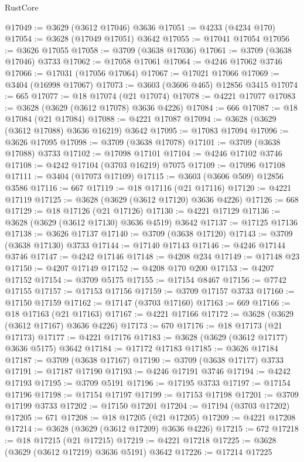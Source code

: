 \begin{lexlean}{RustCore}
\begin{coremodule}
@17049 := @3629 (@3612 @17046) @3636
@17051 := @4233 (@4234 @170)
@17054 := @3628 (@17049 @17051) @3642
@17055 := @17041 @17054
@17056 := @3626 @17055
@17058 := @3709 (@3638 @17036)
@17061 := @3709 (@3638 @17046) @3733
@17062 := @17058 @17061
@17064 := @4246 @17062 @3746
@17066 := @17031 (@17056 @17064)
@17067 := @17021 @17066
@17069 := @3404 (@16998 @17067)
@17073 := @3603 (@3606 @465) @12856 @3415
@17074 := 665
@17077 := @18 @17074 (@21 @17074)
@17078 := @4221 @17077
@17083 := @3628 (@3629 (@3612 @17078) @3636 @4226)
@17084 := 666
@17087 := @18 @17084 (@21 @17084)
@17088 := @4221 @17087
@17094 := @3628 (@3629 (@3612 @17088) @3636 @16219) @3642
@17095 := @17083 @17094
@17096 := @3626 @17095
@17098 := @3709 (@3638 @17078)
@17101 := @3709 (@3638 @17088) @3733
@17102 := @17098 @17101
@17104 := @4246 @17102 @3746
@17108 := @4242 @17104 (@3703 @16219) @7075
@17109 := @17096 @17108
@17111 := @3404 (@17073 @17109)
@17115 := @3603 (@3606 @509) @12856 @3586
@17116 := 667
@17119 := @18 @17116 (@21 @17116)
@17120 := @4221 @17119
@17125 := @3628 (@3629 (@3612 @17120) @3636 @4226)
@17126 := 668
@17129 := @18 @17126 (@21 @17126)
@17130 := @4221 @17129
@17136 := @3628 (@3629 (@3612 @17130) @3636 @4519) @3642
@17137 := @17125 @17136
@17138 := @3626 @17137
@17140 := @3709 (@3638 @17120)
@17143 := @3709 (@3638 @17130) @3733
@17144 := @17140 @17143
@17146 := @4246 @17144 @3746
@17147 := @4242 @17146
@17148 := @4208 @234
@17149 := @17148 @23
@17150 := @4207 @17149
@17152 := @4208 @170 @200
@17153 := @4207 @17152
@17154 := @3709 @5175
@17155 := @17154 @8467
@17156 := @7742 @17155
@17157 := @17153 @17156
@17159 := @3709 @17157 @3733
@17160 := @17150 @17159
@17162 := @17147 (@3703 @17160)
@17163 := 669
@17166 := @18 @17163 (@21 @17163)
@17167 := @4221 @17166
@17172 := @3628 (@3629 (@3612 @17167) @3636 @4226)
@17173 := 670
@17176 := @18 @17173 (@21 @17173)
@17177 := @4221 @17176
@17183 := @3628 (@3629 (@3612 @17177) @3636 @5175) @3642
@17184 := @17172 @17183
@17185 := @3626 @17184
@17187 := @3709 (@3638 @17167)
@17190 := @3709 (@3638 @17177) @3733
@17191 := @17187 @17190
@17193 := @4246 @17191 @3746
@17194 := @4242 @17193
@17195 := @3709 @5191
@17196 := @17195 @3733
@17197 := @17154 @17196
@17198 := @17154 @17197
@17199 := @17153 @17198
@17201 := @3709 @17199 @3733
@17202 := @17150 @17201
@17204 := @17194 (@3703 @17202)
@17205 := 671
@17208 := @18 @17205 (@21 @17205)
@17209 := @4221 @17208
@17214 := @3628 (@3629 (@3612 @17209) @3636 @4226)
@17215 := 672
@17218 := @18 @17215 (@21 @17215)
@17219 := @4221 @17218
@17225 := @3628 (@3629 (@3612 @17219) @3636 @5191) @3642
@17226 := @17214 @17225

\end{coremodule}
\end{lexlean}
